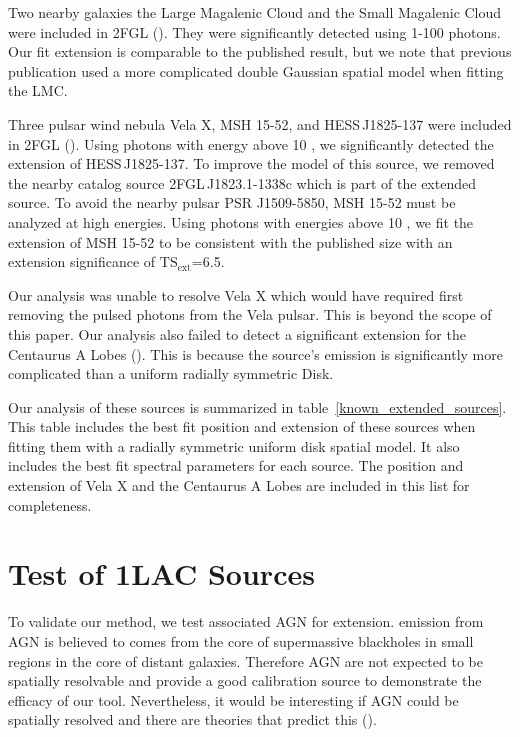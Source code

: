 \documentclass[12pt,preprint]{aastex}
\newcommand{\gev}{\text{GeV}\xspace}
\newcommand{\tsext}{{\ensuremath{\text{TS}_{\text{ext}}}}\xspace}
\begin{document}
Two nearby galaxies the Large Magalenic Cloud and the Small Magalenic
Cloud were included in 2FGL (\cite{lmc,smc}).  They were significantly
detected using 1-100 \gev photons. Our
fit extension is comparable to the published result, but we note that
previous publication used a more complicated double Gaussian spatial
model when fitting the LMC.

Three pulsar wind nebula Vela X, MSH 15-52, and HESS\,J1825-137 were
included in 2FGL (\cite{velax,msh1552,fermi_hess_j1825}).  Using photons
with energy above 10 \gev, we significantly detected the extension of
HESS\,J1825-137.  To improve the model of this source, we removed the
nearby catalog source 2FGL\,J1823.1-1338c which is part of the extended
source.  To avoid the nearby pulsar PSR J1509-5850, MSH 15-52 must be
analyzed at high energies.  Using photons with energies above 10 \gev,
we fit the extension of MSH 15-52 to be consistent with the published
size with an extension significance of \tsext=6.5.  

Our analysis was unable to resolve Vela X which would have required first
removing the pulsed photons from the Vela pulsar. This is beyond the
scope of this paper.  Our analysis also failed to detect a significant
extension for the Centaurus A Lobes (\cite{cen_a_lat}). This is because
the source's emission is significantly more complicated than a uniform
radially symmetric Disk.

Our analysis of these sources is summarized in
table~\ref{known_extended_sources}.  This table includes the best fit
position and extension of these sources when fitting them with a radially
symmetric uniform disk spatial model.  It also includes the best fit
spectral parameters for each source.  The position and extension of Vela
X and the Centaurus A Lobes are included in this list for completeness.

\section{Test of 1LAC Sources}
\label{test_1lac_sources}

To validate our method, we test associated AGN for extension.  \gev
emission from AGN is believed to comes from the core of supermassive
blackholes in small regions in the core of distant galaxies. Therefore AGN
are not expected to be spatially resolvable and provide a good calibration
source to demonstrate the efficacy of our tool. Nevertheless, it would
be interesting if AGN could be spatially resolved and there are theories
that predict this (\cite{pair_halo_paper}).
\end{document}
